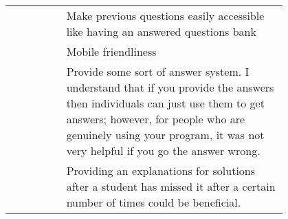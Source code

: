 {\begin{longtable}{R|p{0.8\linewidth}}
		& Make previous questions easily accessible like having an answered questions bank                                                                                                                                                                                                                                                                                                                                                                                                                                                                                                                                                                                                                                                                 \\
		& Mobile friendliness                                                                                                                                                                                                                                                                                                                                                                                                                                                                                                                                                                                                                                                                                                                              \\
		& Provide some sort of answer system. I understand that if you provide the answers then individuals can just use them to get answers; however, for people who are genuinely using your program, it was not very helpful if you go the answer wrong.                                                                                                                                                                                                                                                                                                                                                                                                                                                                                                \\
		& Providing an explanations for solutions after a student has missed it after a certain number of times could be beneficial.                                                                                                                                                                                                                                                                                                                                                                                                                                                                                                                                                                                                                       \\

\end{longtable}}
